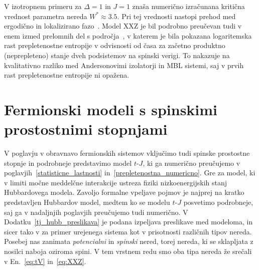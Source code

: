 \noindent
V izotropnem primeru za $\Delta=1$ in $J=1$ znaša numerično izračunana kritična vrednost parametra nereda $W^*\approx 3.5.$ Pri tej vrednosti nastopi prehod med ergodično in lokalizirano fazo~\cite{pal2010many}. Model XXZ je bil podrobno preučevan tudi v enem izmed prelomnih del s področja~\cite{vznidarivc2008many}, v katerem je bila pokazana logaritemska rast prepletenostne entropije v odvisnosti od časa za začetno produktno (neprepleteno) stanje dveh podsistemov na spinski verigi. To nakazuje na kvalitativno razliko med Andersonovimi izolatorji in MBL sistemi, saj v prvih rast prepletenostne entropije ni opažena. 

\section{Fermionski modeli s spinskimi prostostnimi stopnjami}
\label{spinfull}
V poglavju v obravnavo fermionskih sistemov vključimo tudi spinske prostostne stopnje in podrobneje predstavimo model $t$-$J$, ki ga numerično preučujemo v poglavjih~\ref{statisticne_lastnosti} in~\ref{prepletenostna_numericno}. Gre za model, ki v limiti močne meddelčne interakcije ustreza fiziki nizkoenergijskih stanj Hubbardovega modela. Zavoljo formalne vpeljave pojmov je najprej na kratko predstavljen Hubbardov model, medtem ko se modelu $t$-$J$ posvetimo podrobneje, saj ga v nadaljnjih poglavjih preučujemo tudi numerično. V Dodatku~\ref{tj_hubb_preslikava} je podana izpeljava preslikave med modeloma, in sicer tako v za primer urejenega sistema kot v prisotnosti različnih tipov nereda.  Posebej nas zanimata \emph{potencialni} in \emph{spinski} nered, torej nereda, ki se sklapljata z nosilci naboja oziroma spini. V tem vrstnem redu smo oba tipa nereda že srečali v En.~\eqref{eq:tV} in~\eqref{eq:XXZ}.\\\\
